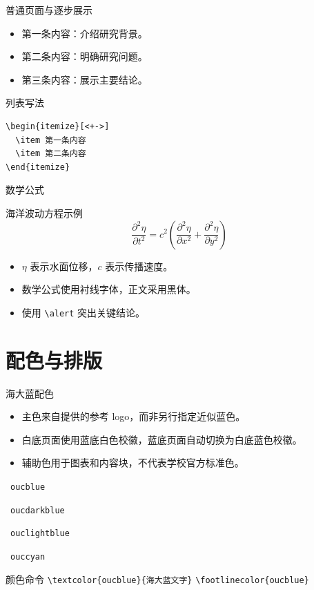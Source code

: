 \documentclass{beamer}
\newcommand{\testcolor}[1]{\colorbox{#1}{\strut\hspace{1em}}~\texttt{#1}}
\begin{document}
\begin{frame}[fragile]{普通页面与逐步展示}
\begin{itemize}[<+->]
  \item 第一条内容：介绍研究背景。
  \item 第二条内容：明确研究问题。
  \item 第三条内容：展示主要结论。
\end{itemize}
\begin{block}{列表写法}
\begin{verbatim}
\begin{itemize}[<+->]
  \item 第一条内容
  \item 第二条内容
\end{itemize}
\end{verbatim}
\end{block}
\end{frame}

\begin{frame}[fragile]{数学公式}
\begin{block}{海洋波动方程示例}
\[
\frac{\partial^2\eta}{\partial t^2}
= c^2\left(\frac{\partial^2\eta}{\partial x^2}
+\frac{\partial^2\eta}{\partial y^2}\right)
\]
\end{block}
\begin{itemize}
  \item $\eta$ 表示水面位移，$c$ 表示传播速度。
  \item 数学公式使用衬线字体，正文采用黑体。
  \item 使用 \verb|\alert| 突出\alert{关键结论}。
\end{itemize}
\end{frame}

\section{配色与排版}

\begin{frame}[fragile]{海大蓝配色}
\begin{itemize}
  \item 主色来自提供的参考 logo，而非另行指定近似蓝色。
  \item 白底页面使用蓝底白色校徽，蓝底页面自动切换为白底蓝色校徽。
  \item 辅助色用于图表和内容块，不代表学校官方标准色。
\end{itemize}
\medskip
\testcolor{oucblue}\quad\testcolor{oucdarkblue}\\[1ex]
\testcolor{ouclightblue}\quad\testcolor{ouccyan}
\begin{block}{颜色命令}
\verb|\textcolor{oucblue}{海大蓝文字}|\qquad
\verb|\footlinecolor{oucblue}|
\end{block}
\end{frame}
\end{document}
